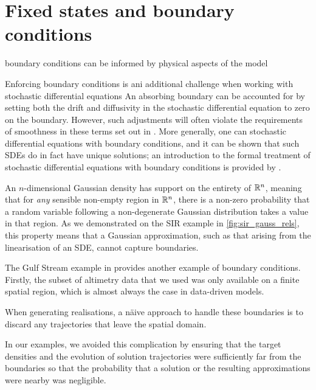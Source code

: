 \section{Fixed states and boundary conditions}

boundary conditions can be informed by physical aspects of the model


Enforcing boundary conditions is ani additional challenge when working with stochastic differential equations
An absorbing boundary can be accounted for by setting both the drift and diffusivity in the stochastic differential equation to zero on the boundary.
However, such adjustments will often violate the requirements of smoothness in these terms set out in .
More generally, one can stochastic differential equations with boundary conditions, and it can be shown that such SDEs do in fact have unique solutions; an introduction to the formal treatment of stochastic differential equations with boundary conditions is provided by \citet{Pilipenko_2014_IntroductionStochasticDifferential}.

An \(n\)-dimensional Gaussian density has support on the entirety of \(\mathbb{R}^n\), meaning that for \emph{any} sensible non-empty region in \(\mathbb{R}^n\), there is a non-zero probability that a random variable following a non-degenerate Gaussian distribution takes a value in that region.
As we demonstrated on the SIR example in \cref{fig:sir_gauss_rels}, this property means that a Gaussian approximation, such as that arising from the linearisation of an SDE, cannot capture boundaries.

The Gulf Stream example in  provides another example of boundary conditions.
Firstly, the subset of altimetry data that we used was only available on a finite spatial region, which is almost always the case in data-driven models.

When generating realisations, a n\"aive approach to handle these boundaries is to discard any trajectories that leave the spatial domain.

In our examples, we avoided this complication by ensuring that the target densities and the evolution of solution trajectories were sufficiently far from the boundaries so that the probability that a solution or the resulting approximations were nearby was negligible.

